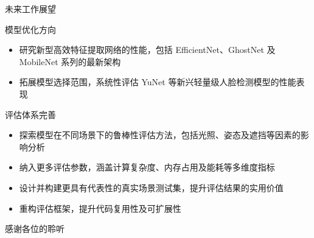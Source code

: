 \documentclass{beamer}
\begin{document}
\begin{frame}{未来工作展望}
    \begin{block}{模型优化方向}
        \begin{itemize}
            \footnotesize
            \item 研究新型高效特征提取网络的性能，包括 EfficientNet、GhostNet 及 MobileNet 系列的最新架构
            \item 拓展模型选择范围，系统性评估 YuNet 等新兴轻量级人脸检测模型的性能表现
        \end{itemize}
    \end{block}

    \begin{block}{评估体系完善}
        \begin{itemize}
            \footnotesize
            \item 探索模型在不同场景下的鲁棒性评估方法，包括光照、姿态及遮挡等因素的影响分析
            \item 纳入更多评估参数，涵盖计算复杂度、内存占用及能耗等多维度指标
            \item 设计并构建更具有代表性的真实场景测试集，提升评估结果的实用价值
            \item 重构评估框架，提升代码复用性及可扩展性
        \end{itemize}
    \end{block}
\end{frame}

\begin{frame}
    \begin{center}
        {\Huge\calligra 感谢各位的聆听}
    \end{center}
\end{frame}
\end{document}

